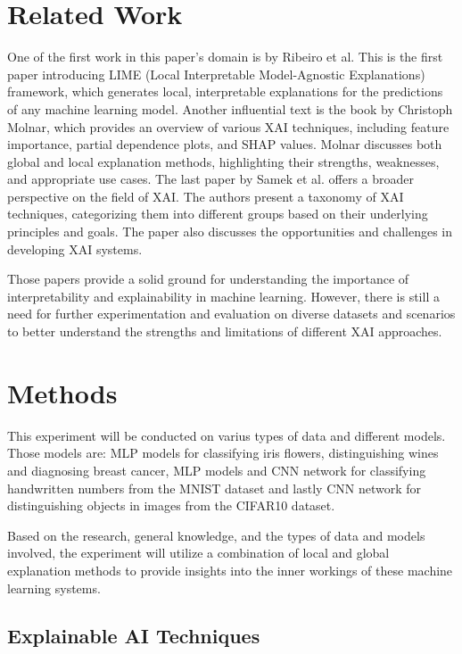 \documentclass[conference]{IEEEtran}
\begin{document}
\section{Related Work}\label{sec:related-work}

    One of the first work in this paper's domain is \cite{ribeiro2016should} by Ribeiro et al.
    This is the first paper introducing LIME (Local Interpretable Model-Agnostic Explanations) framework, which generates local, interpretable explanations for the predictions of any machine learning model.
    Another influential text is the book \cite{molnar2019interpretable} by Christoph Molnar, which provides an overview of various XAI techniques, including feature importance, partial dependence plots, and SHAP values.
    Molnar discusses both global and local explanation methods, highlighting their strengths, weaknesses, and appropriate use cases.
    The last paper \cite{samek2017explainable} by Samek et al. offers a broader perspective on the field of XAI.
    The authors present a taxonomy of XAI techniques, categorizing them into different groups based on their underlying principles and goals.
    The paper also discusses the opportunities and challenges in developing XAI systems.

    Those papers provide a solid ground for understanding the importance of interpretability and explainability in machine learning.
    However, there is still a need for further experimentation and evaluation on diverse datasets and scenarios to better understand the strengths and limitations of different XAI approaches.

\section{Methods}\label{sec:methodology}

    This experiment will be conducted on varius types of data and different models.
    Those models are: MLP models for classifying iris flowers, distinguishing wines and diagnosing breast cancer, MLP models and CNN network for classifying handwritten numbers from the MNIST dataset and lastly CNN network for distinguishing objects in images from the CIFAR10 dataset.

    Based on the research, general knowledge, and the types of data and models involved, the experiment will utilize a combination of local and global explanation methods to provide insights into the inner workings of these machine learning systems.

\subsection{Explainable AI Techniques}\label{subsec:explainable-ai-techniques}
\end{document}
